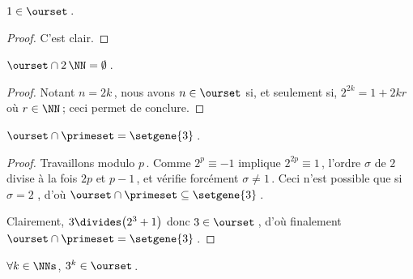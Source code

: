 \begin{fact}
	$1 \in \ourset$\,.
\end{fact}

\begin{proof}
	C'est clair.
\end{proof}




\begin{fact} \label{no-even}
	$\ourset \cap 2\,\NN = \emptyset$\,.
\end{fact}

\begin{proof}
	Notant $n = 2 k$\,, nous avons $n \in \ourset$ si, et seulement si, $2^{2 k} = 1 + 2 k r$ où $r \in \NN$\,; ceci permet de conclure.
\end{proof}




\begin{fact} \label{prime-sol}
	$\ourset \cap \primeset = \setgene{3}$\,.
\end{fact}

\begin{proof}
	Travaillons modulo $p$\,.
	Comme $2^p \equiv - 1$
	implique
	$2^{2p} \equiv 1$\,,
	l'ordre $\sigma$ de $2$ divise à la fois $2p$ et $p-1$\,, et vérifie forcément $\sigma \neq 1$\,.
	Ceci n'est possible que si $\sigma = 2$ , d'où $\ourset \cap \primeset \subseteq \setgene{3}$\,.
	
	\medskip
	
	Clairement, $3 \divides \big( 2^3 + 1 \big)$ donc $3 \in \ourset$\,, d'où finalement $\ourset \cap \primeset = \setgene{3}$\,.
\end{proof}




\begin{fact} \label{power-of-3}
	$\forall k \in \NNs$, $3^k \in \ourset$\,.
\end{fact}

